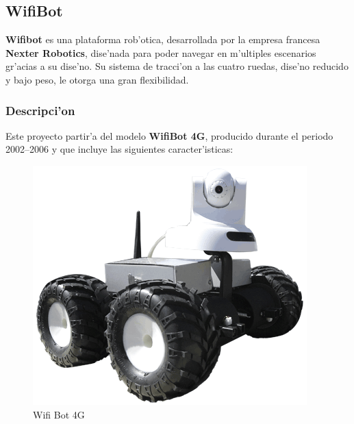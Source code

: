 \documentclass[twoside]{article}
\begin{document}
\subsection{WifiBot}
\textbf{Wifibot} es una plataforma rob'otica, desarrollada por la empresa francesa \textbf{Nexter Robotics}, dise'nada para poder navegar en m'ultiples escenarios gr'acias a su dise'no. Su sistema de tracci'on a las cuatro ruedas, dise'no reducido y bajo peso, le otorga una gran flexibilidad.

\subsubsection{Descripci'on}
Este proyecto partir'a del modelo \textbf{WifiBot 4G}, producido durante el periodo 2002--2006 y que incluye las siguientes caracter'isticas:

\begin{figure}[ht]
\centering
\includegraphics[scale=0.5]{images/Visuel_Wifibot_2.png} 
\caption{Wifi Bot 4G}
\label{fig:Wifi Bot 4G}
\end{figure}
\end{document}
